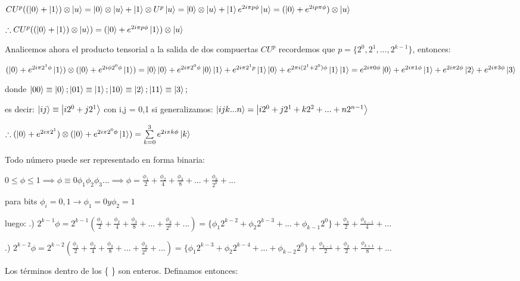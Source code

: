 \documentclass[11pt, spanish]{report}
\begin{document}
$CU^p ((\ket{0} + \ket{1}) \otimes \ket{u} = \ket{0} \otimes \ket{u} + \ket{1} \otimes U^p \ket{u} = \ket{0} \otimes \ket{u} + \ket{1} e^{2i \pi p \phi} \ket{u} = (\ket{0} + e^{2 i p \pi \phi}) \otimes \ket{u}$

$\therefore CU^p ((\ket{0} + \ket{1}) \otimes \ket{u}) = (\ket{0} + e^{2 i \pi p \phi} \ket{1}) \otimes \ket{u}$

Analicemos ahora el producto tensorial a la salida de dos compuertas $CU^p$ recordemos que $p = \{2^0, 2^1, ..., 2^{k-1}\}$, entonces:

$(\ket{0} + e^{2 i \pi 2^1 \phi} \ket{1}) \otimes (\ket{0} + e^{2 i \phi 2^0 \phi} \ket{1}) = \ket{0} \ket{0} + e^{2 i \pi 2^0 \phi} \ket{0} \ket{1} + e^{2 i \pi 2^1 p} \ket{1} \ket{0} + e^{2 \pi i (2^1 + 2^0) \phi} \ket{1} \ket{1} = e^{2 i \pi 0 \phi} \ket{0} + e^{2 i \pi 1 \phi} \ket{1} + e^{2 i \pi 2 \phi} \ket{2} + e^{2 i \pi 3 \phi} \ket{3}$

donde $\ket{00} \equiv \ket{0}; \ket{01} \equiv \ket{1}; \ket{10} \equiv \ket{2}; \ket{11} \equiv \ket{3};$

es decir: $\ket{ij} \equiv \ket{i 2^0 + j 2^1}$ con i,j = 0,1
si generalizamos: $\ket{i j k ... n} = \ket{i 2^0 + j 2^1 + k 2^2 + ... + n 2^{n-1}}$

$\therefore (\ket{0} + e^{2 i \pi 2^1}) \otimes (\ket{0} + e^{2 i \pi 2^0 \phi} \ket{1}) = \sum\limits_{k = 0}^3 e^{2i \pi k \phi} \ket{k}$

Todo número puede ser representado en forma binaria:

$0 \leq \phi \leq 1 \implies \phi \equiv 0 \phi_1 \phi_2 \phi_3 ... \implies \phi = \frac{\phi_1}{2} + \frac{\phi_2}{4} + \frac{\phi_3}{8} + ... + \frac{\phi_k}{2^k} + ...$

para bits $\phi_i = 0,1 \rightarrow \phi_1 = 0 y \phi_2 = 1$

luego: .) $2^{k-1} \phi = 2^{k-1} ( \frac{\phi_1}{2} + \frac{\phi_2}{4} + \frac{\phi_3}{8} + ... + \frac{\phi_k}{2^k} + ...) = \{\phi_1 2^{k-2} + \phi_2 2^{k-3} + ... + \phi_{k-1} 2^0\} + \frac{\phi_k}{2} + \frac{\phi_{k-1}}{4} + ...$

.) $2^{k-2} \phi = 2^{k-2} ( \frac{\phi_1}{2} + \frac{\phi_2}{4} + \frac{\phi_3}{8} + ... + \frac{\phi_k}{2^k} + ...) = \{\phi_1 2^{k-3} + \phi_2 2^{k-4} + ... + \phi_{k-2} 2^0\} + \frac{\phi_{k-1}}{2} + \frac{\phi_k}{2} + \frac{\phi_{k+1}}{8} + ...$

Los términos dentro de los \{ \} son enteros. Definamos entonces:
\end{document}
